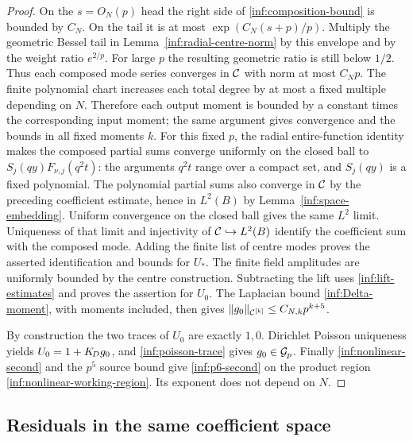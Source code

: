 \begin{proof}
On the $s=O_N(p)$ head the right side of
\eqref{inf:composition-bound} is bounded by $C_N$.
On the tail it is at most $\exp(C_N(s+p)/p)$.
Multiply the geometric Bessel tail in
Lemma~\ref{inf:radial-centre-norm} by this envelope and by the
weight ratio $e^{2/p}$. For large $p$ the resulting geometric
ratio is still below $1/2$. Thus each composed mode series
converges in $\mathcal C$ with norm at most $C_Np$.
The finite polynomial chart increases each total degree by at
most a fixed multiple depending on $N$. Therefore each output
moment is bounded by a constant times the corresponding input
moment; the same argument gives convergence and the bounds in
all fixed moments $k$.
For this fixed $p$, the radial entire-function identity makes
the composed partial sums converge uniformly on the closed ball
to $S_j(qy)F_{\nu,j}(q^2t)$: the arguments $q^2t$ range over a
compact set, and $S_j(qy)$ is a fixed polynomial. The polynomial
partial sums also converge in $\mathcal C$ by the preceding coefficient
estimate, hence in $L^2(B)$ by Lemma~\ref{inf:space-embedding}.
Uniform convergence on the closed ball gives the same $L^2$ limit.
Uniqueness of that limit and injectivity of $\mathcal C\hookrightarrow L^2(B)$
identify the coefficient sum with the composed mode.
Adding the finite list of centre modes proves the asserted
identification and bounds for $U_*$.
The finite field amplitudes are uniformly bounded by the centre
construction. Subtracting the lift uses \eqref{inf:lift-estimates}
and proves the assertion for $U_0$.
The Laplacian bound \eqref{inf:Delta-moment}, with moments included,
then gives $\lVert g_0\rVert_{\mathcal C^{[k]}}\le C_{N,k}p^{k+5}$.

By construction the two traces of $U_0$ are exactly $1,0$.
Dirichlet Poisson uniqueness yields $U_0=1+K_{\!D} g_0$, and
\eqref{inf:poisson-trace} gives $g_0\in\mathcal{G}_p$.
Finally \eqref{inf:nonlinear-second} and the $p^5$ source bound
give \eqref{inf:p6-second} on the product region
\eqref{inf:nonlinear-working-region}. Its exponent does not depend
on $N$.
\end{proof}

\subsection{Residuals in the same coefficient space}

